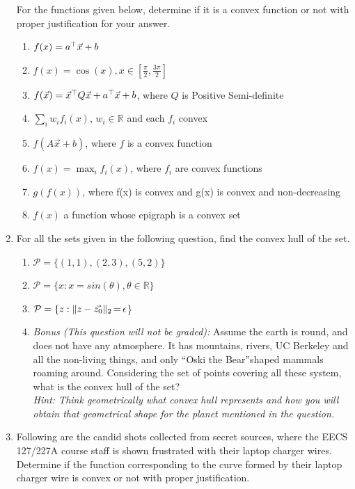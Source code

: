 \begin{enumerate}
For the functions given below, determine if it is a convex function or not with proper justification for your answer.
\begin{enumerate}
    \item
    $f(x) = a^{\top} \vec{x} + b$
    \item
    $f(x) = \cos(x), x\in [\frac{\pi}{2},\frac{3\pi}{2}]$
    \item
    $f(\vec{x}) = \vec{x}^{\top} Q\vec{x} + a^{\top} \vec{x} + b$, where $Q$ is Positive Semi-definite
    \item
    $\sum_{i}w_if_i(x)$, $w_i \in \mathbb{R}$ and each $f_i$ convex
    \item
    $f(A\vec{x}+b)$, where $f$ is a convex function
    \item 
    $f(x) = \max_i f_i(x)$, where $f_i$ are convex functions
    \item
    $g(f(x))$, where f(x) is convex and g(x) is convex and non-decreasing
    \item
    $f(x)$ a function whose epigraph is a convex set
\end{enumerate}
\sol{
    
    }
\item
For all the sets given in the following question, find the convex hull of the set.
\begin{enumerate}
    \item 
    $\mathcal{P} = \{(1,1),(2,3),(5,2)\}$
    \item
    $\mathcal{P} = \{x: x = sin(\theta), \theta \in \mathbb{R}\}$
    \item$\mathcal{P} = \{z : \|z - \vec{z_0}\|_2 {\,{=}\,} \epsilon$\}
    \item
    \textit{Bonus (This question will not be graded):} Assume the earth is round, and does not have any atmosphere. It has mountains, rivers, UC Berkeley and all the non-living things, and only \textquotedblleft Oski the Bear\textquotedblright shaped mammals roaming around. Considering the set of points covering all these system, what is the convex hull of the set?\\
    \textit{Hint: Think geometrically what convex hull represents and how you will obtain that geometrical shape for the planet mentioned in the question.}
    \\[1cm]
\end{enumerate}
\sol{

}
\item
Following are the candid shots collected from secret sources, where the EECS 127/227A course staff is shown frustrated with their laptop charger wires. Determine if the function corresponding to the curve formed by their laptop charger wire is convex or not with proper justification.

\end{enumerate}
